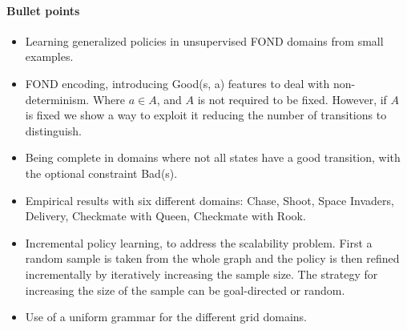 \documentclass[a4paper]{article}
\begin{document}
\paragraph{Bullet points}
\begin{itemize}
\item Learning generalized policies in unsupervised FOND domains from small examples.
\item FOND encoding, introducing Good(s, a) features to deal with non-determinism. Where $a \in A$, and $A$ is not required to be fixed. However, if $A$ is fixed we show a way to exploit it reducing the number of transitions to distinguish.
\item Being complete in domains where not all states have a good transition, with the optional constraint Bad(s).
\item Empirical results with six different domains: Chase, Shoot, Space Invaders, Delivery, Checkmate with Queen, Checkmate with Rook.
\item Incremental policy learning, to address the scalability problem. First a random sample is taken from the whole graph and the policy is then refined incrementally by iteratively increasing the sample size. The strategy for increasing the size of the sample can be goal-directed or random.
\item Use of a uniform grammar for the different grid domains.
\end{itemize}




\end{document}
